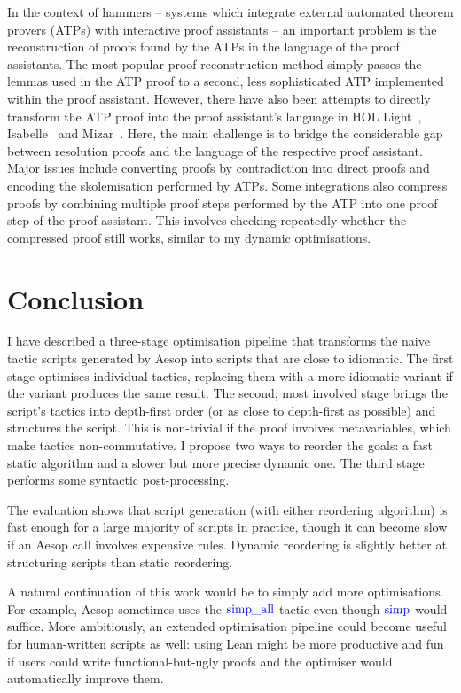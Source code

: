 \documentclass[sigplan,10pt,anonymous,review]{acmart}
\newcommand{\tac}[1]{\ensuremath{\mathrm{\mathcolor{blue}{#1}}}}
\begin{document}
In the context of hammers -- systems which integrate external automated theorem provers (ATPs) with interactive proof assistants -- an important problem is the reconstruction of proofs found by the ATPs in the language of the proof assistants.
The most popular proof reconstruction method simply passes the lemmas used in the ATP proof to a second, less sophisticated ATP implemented within the proof assistant.
However, there have also been attempts to directly transform the ATP proof into the proof assistant's language in HOL Light~\cite{PRocH}, Isabelle~\cite{Paulson2007,Blanchette2013a,Blanchette2013b,Blanchette2016} and Mizar~\cite{ATPMizar,MizarATP}.
Here, the main challenge is to bridge the considerable gap between resolution proofs and the language of the respective proof assistant.
Major issues include converting proofs by contradiction into direct proofs and encoding the skolemisation performed by ATPs.
Some integrations also compress proofs by combining multiple proof steps performed by the ATP into one proof step of the proof assistant.
This involves checking repeatedly whether the compressed proof still works, similar to my dynamic optimisations.

\section{Conclusion}%
\label{sec:concl}

I have described a three-stage optimisation pipeline that transforms the naive tactic scripts generated by Aesop into scripts that are close to idiomatic.
The first stage optimises individual tactics, replacing them with a more idiomatic variant if the variant produces the same result.
The second, most involved stage brings the script's tactics into depth-first order (or as close to depth-first as possible) and structures the script.
This is non-trivial if the proof involves metavariables, which make tactics non-commutative.
I propose two ways to reorder the goals: a fast static algorithm and a slower but more precise dynamic one.
The third stage performs some syntactic post-processing.

The evaluation shows that script generation (with either reordering algorithm) is fast enough for a large majority of scripts in practice, though it can become slow if an Aesop call involves expensive rules.
Dynamic reordering is slightly better at structuring scripts than static reordering.

A natural continuation of this work would be to simply add more optimisations.
For example, Aesop sometimes uses the \tac{simp\_all} tactic even though \tac{simp} would suffice.
More ambitiously, an extended optimisation pipeline could become useful for human-written scripts as well:
using Lean might be more productive and fun if users could write functional-but-ugly proofs and the optimiser would automatically improve them.



\end{document}
